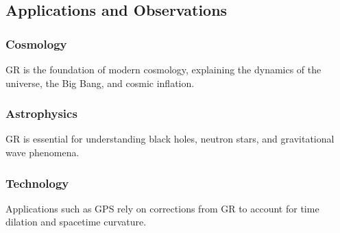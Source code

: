 \subsection{Applications and Observations}

\subsubsection{Cosmology}
GR is the foundation of modern cosmology, explaining the dynamics of the universe, the Big Bang, and cosmic inflation.

\subsubsection{Astrophysics}
GR is essential for understanding black holes, neutron stars, and gravitational wave phenomena.

\subsubsection{Technology}
Applications such as GPS rely on corrections from GR to account for time dilation and spacetime curvature.





